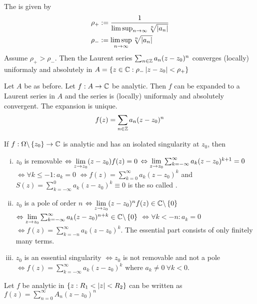 \begin{definition}
    The  is given by
    \begin{align*}
        \rho_+ &:= \frac{1}{\limsup_{n \rightarrow \infty} \sqrt[n]{\left\vert a_n \right\vert}}
        \\
        \rho_- &:= \limsup_{n \rightarrow \infty} \sqrt[n]{\left\vert a_n \right\vert}
    \end{align*}
    Assume $\rho_+ > \rho_-$. Then the Laurent series $\sum_{n \in \mathbb{Z}} a_n (z-z_0)^n$
    converges (locally) uniformaly and absolutely in
    $A = \left\{ z \in \mathbb{C} : \rho_- \left\vert z-z_0 \right\vert < \rho_+ \right\}$
\end{definition}

\begin{theorem}
    Let $A$ be as before. Let $f: A \rightarrow \mathbb{C}$ be analytic. Then $f$ can be
    expanded to a Laurent series in $A$ and the series is (locally) uniformaly
    and absolutely convergent. The expansion is unique.
    \begin{align*}
        f(z) = \sum_{n \in \mathbb{Z}} a_n (z-z_0)^n
    \end{align*}
\end{theorem}

\begin{theorem}
    If $f: \Omega \backslash \left\{ z_0 \right\} \rightarrow \mathbb{C}$ is
    analytic and has an isolated singularity at $z_0$, then
    \begin{enumerate}[(i)]
        \item $z_0$ is removable $\Leftrightarrow \lim\limits_{z \rightarrow z_0} (z-z_0)f(z) = 0$
            $\Leftrightarrow \lim\limits_{z \rightarrow z_0} \sum_{k=-\infty}^\infty a_k (z-z_0)^{k+1} = 0$
            $\Leftrightarrow \forall k \leq -1: a_k =0$
            $\Leftrightarrow f(z) = \sum_{k=0}^\infty a_k (z-z_0)^k$ and
            $S(z) = \sum_{k=-\infty}^0 a_k (z-z_0)^k \equiv 0$ is the so called .
        \item $z_0$ is a pole of order $n$ $\Leftrightarrow \lim\limits_{z \rightarrow z_0}
            (z-z_0)^n f(z) \in \mathbb{C} \backslash \left\{ 0 \right\}$
            $\Leftrightarrow \lim\limits_{z \rightarrow z_0} \sum_{k=-\infty}^\infty a_k (z-z_0)^{n+k}
                \in \mathbb{C} \backslash \left\{ 0 \right\}$
            $\Leftrightarrow \forall k < -n : a_k = 0$
            $\Leftrightarrow f(z) = \sum_{k=-n}^\infty a_k (z-z_0)^k$.
            The essential part consists of only finitely many terms.
        \item $z_0$ is an essential singularity $\Leftrightarrow z_0$ is not
            removable and not a pole $\Leftrightarrow f(z) = \sum_{k=-\infty}^\infty
            a_k (z-z_0)^k$ where $a_k \neq 0 \ \forall k < 0$.
    \end{enumerate}
\end{theorem}

\begin{theorem}
    Let $f$ be analytic in $\left\{ z : R_1 < \left\vert z \right\vert < R_2 \right\}$ can be
    written as $f(z) = \sum_{n=0}^\infty A_n (z-z_0)^n$
\end{theorem}

